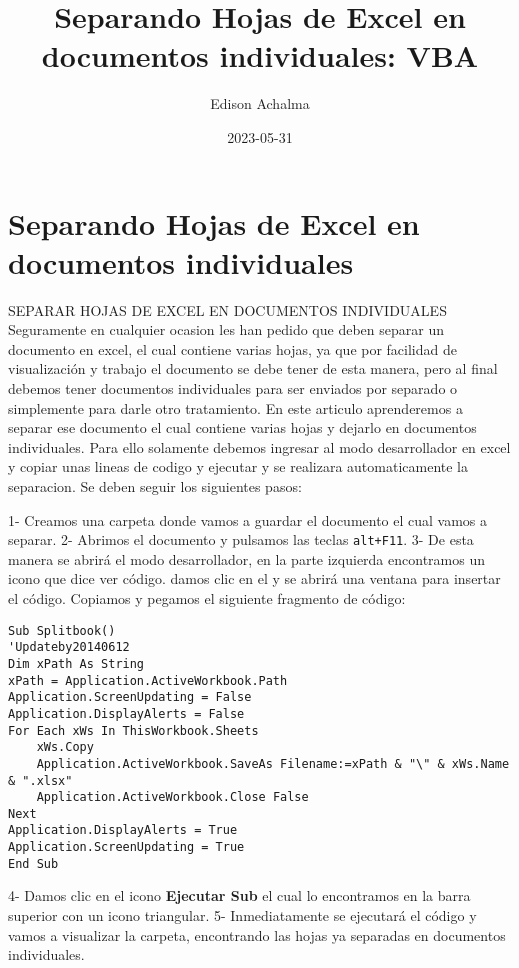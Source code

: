 \documentclass[
  jou,
  floatsintext,
  longtable,
  a4paper,
  nolmodern,
  notxfonts,
  notimes,
  colorlinks=true,linkcolor=blue,citecolor=blue,urlcolor=blue]{apa7}
\title{Separando Hojas de Excel en documentos individuales: VBA}
\author{Edison Achalma}
\affiliation{
{Escuela Profesional de Economía, Universidad Nacional de San Cristóbal
de Huamanga}}
\date{2023-05-31}
\begin{document}
\maketitle

\hypertarget{toc}{}
\tableofcontents
\newpage
\section[Introduction]{Separando Hojas de Excel en documentos
individuales}

\setcounter{secnumdepth}{-\maxdimen} %

\setlength\LTleft{0pt}


SEPARAR HOJAS DE EXCEL EN DOCUMENTOS INDIVIDUALES Seguramente en
cualquier ocasion les han pedido que deben separar un documento en
excel, el cual contiene varias hojas, ya que por facilidad de
visualización y trabajo el documento se debe tener de esta manera, pero
al final debemos tener documentos individuales para ser enviados por
separado o simplemente para darle otro tratamiento. En este articulo
aprenderemos a separar ese documento el cual contiene varias hojas y
dejarlo en documentos individuales. Para ello solamente debemos ingresar
al modo desarrollador en excel y copiar unas lineas de codigo y ejecutar
y se realizara automaticamente la separacion. Se deben seguir los
siguientes pasos:

1- Creamos una carpeta donde vamos a guardar el documento el cual vamos
a separar. 2- Abrimos el documento y pulsamos las teclas
\texttt{alt+F11}. 3- De esta manera se abrirá el modo desarrollador, en
la parte izquierda encontramos un icono que dice ver código. damos clic
en el y se abrirá una ventana para insertar el código. Copiamos y
pegamos el siguiente fragmento de código:

\begin{verbatim}
Sub Splitbook()
'Updateby20140612
Dim xPath As String
xPath = Application.ActiveWorkbook.Path
Application.ScreenUpdating = False
Application.DisplayAlerts = False
For Each xWs In ThisWorkbook.Sheets
    xWs.Copy
    Application.ActiveWorkbook.SaveAs Filename:=xPath & "\" & xWs.Name & ".xlsx"
    Application.ActiveWorkbook.Close False
Next
Application.DisplayAlerts = True
Application.ScreenUpdating = True
End Sub
\end{verbatim}

4- Damos clic en el icono \textbf{Ejecutar Sub} el cual lo encontramos
en la barra superior con un icono triangular. 5- Inmediatamente se
ejecutará el código y vamos a visualizar la carpeta, encontrando las
hojas ya separadas en documentos individuales.
\end{document}
